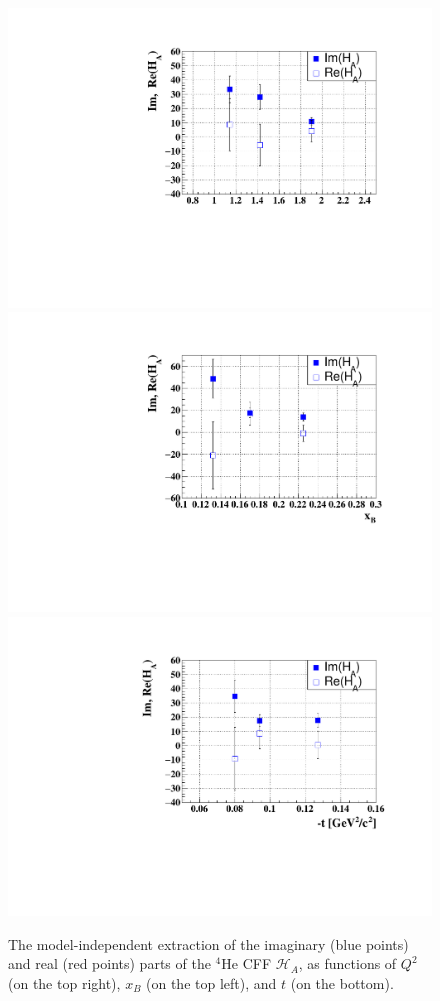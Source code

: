 \begin{figure}[h!]
\hspace{-0.5in}\includegraphics[scale=0.38]{fig_updated/f_coh_cff_Q2.pdf}
\hspace{-0.3in}\includegraphics[scale=0.38]{fig_updated/f_coh_cff_xB.pdf}
\centering \includegraphics[scale=0.38]{fig_updated/f_coh_cff_t.pdf}
\caption{The model-independent extraction of the imaginary (blue points) and 
real (red points) parts of the $^4$He CFF $\mathcal{H}_A$, as functions of 
$Q^{2}$ (on the top right), $x_B$ (on the top left), and $t$ (on the bottom).}
\label{fig:HA_CFF}
\end{figure}


